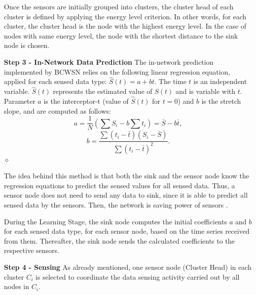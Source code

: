 \documentclass{acm_proc_article-sp}
\newcommand{\dia}{\hspace*{.1cm} \hfill $\diamond$}
\begin{document}
Once the sensors are initially grouped into clusters, the cluster head of each
cluster is defined by applying the energy level criterion.
In other words, for each cluster, the cluster head is the node with the highest
energy level. In the case of nodes with same energy level, the node with the
shortest distance to the sink node is chosen.
\vspace*{-.3cm}

{\bf Step 3 - In-Network Data Prediction}
The in-network prediction implemented by BCWSN relies on the
following linear regression equation, applied for each sensed data type:
$\hat{S}(t) = a + bt$.
The time $t$ is an independent variable. $\hat{S}(t)$ represents the estimated
value of $S(t)$ and is variable with $t$. Parameter $a$ is the interceptor-t
(value of $\hat{S}(t)$ for $t=0$) and $b$ is the stretch slope, and are computed
as follows:
\begin{equation}
\label{coef-a}
	a = \frac{1}{N}\left(\sum S_{i} - b\sum t_{i} \right) = \bar{S} - b\bar{t},
\end{equation}
\vspace*{-.3cm}
\begin{equation}
\label{coef-b}
	b = \frac{\sum \left(t_{i} - \bar{t}\right)\left(S_{i} - \bar{S}\right)}{\sum \left(t_{i} - \bar{t}\right)^{2}}.
\end{equation}
	\dia
\vspace*{-.4cm}

The idea behind this method is that both the sink and the sensor node know the
regression equations to predict the sensed values for all sensed data. Thus, a
sensor node does not need to send any data to sink, since it is able to predict
all sensed data by the sensors. Then, the network is saving power of sensors
\cite{MaiaACR2013}.
\vspace*{-.3cm}

During the Learning Stage, the sink node computes the initial coefficients $a$
and $b$ for each sensed data type, for each sensor node, based on the time
series received from them. Thereafter, the sink node sends the calculated
coefficients to the respective sensors.
\vspace*{-.3cm}

{\bf Step 4 - Sensing}
As already mentioned, one sensor node (Cluster Head) in each cluster $C_{i}$ is
selected to coordinate the data sensing activity carried out by all nodes in
$C_{i}$.
\vspace*{-.3cm}
\end{document}
